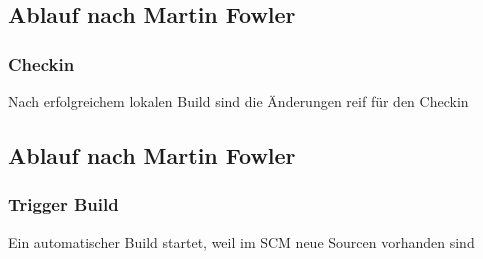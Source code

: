 \documentclass[hyperref={pdfpagelabels=false}]{beamer}
\begin{document}
\subsection{Ablauf nach Martin Fowler}
\begin{frame} [t]
\frametitle{Checkin}
\begin{figure}[h]
  \centering
\end{figure}
\vspace{0.5cm} 
Nach erfolgreichem lokalen Build sind die Änderungen reif für den Checkin
\end{frame}

\subsection{Ablauf nach Martin Fowler}
\begin{frame} [t]
\frametitle{Trigger Build}
\begin{figure}[h]
  \centering
\end{figure}
\vspace{0.5cm} 
Ein automatischer Build startet, weil im SCM neue Sourcen vorhanden sind
\end{frame}
\end{document}
